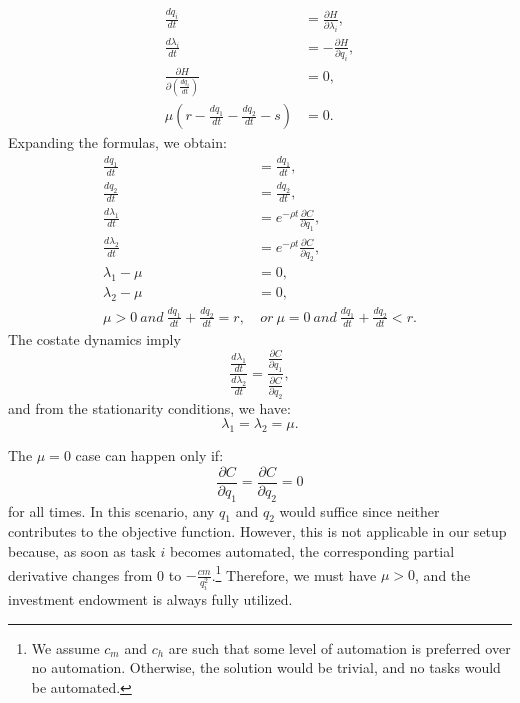 \documentclass{article}
\theoremstyle{plain}
\theoremstyle{plain}
\begin{document}
\begin{align*}
\frac{dq_{i}}{dt} & =\frac{\partial H}{\partial\lambda_{i}},\tag{State Dynamics}\\
\frac{d\lambda_{i}}{dt} & =-\frac{\partial H}{\partial q_{i}},\tag{Costate Dynamics}\\
\frac{\partial H}{\partial\left(\frac{dq_{i}}{dt}\right)} & =0,\tag{Stationarity}\\
\mu\left(r-\frac{dq_{1}}{dt}-\frac{dq_{2}}{dt}-s\right) & =0.\tag{Complementary Slackness}
\end{align*}
Expanding the formulas, we obtain:
\begin{align*}
\frac{dq_{1}}{dt} & =\frac{dq_{1}}{dt},\\
\frac{dq_{2}}{dt} & =\frac{dq_{2}}{dt},\\
\frac{d\lambda_{1}}{dt} & =e^{-\rho t}\frac{\partial C}{\partial q_{1}},\\
\frac{d\lambda_{2}}{dt} & =e^{-\rho t}\frac{\partial C}{\partial q_{2}},\\
\lambda_{1}-\mu & =0,\\
\lambda_{2}-\mu & =0,\\
\mu>0\ and\ \frac{dq_{1}}{dt}+\frac{dq_{2}}{dt}=r, & \ or\ \mu=0\ and\ \frac{dq_{1}}{dt}+\frac{dq_{2}}{dt}<r.
\end{align*}
The costate dynamics imply
\[
\frac{\frac{d\lambda_{1}}{dt}}{\frac{d\lambda_{2}}{dt}}=\frac{\frac{\partial C}{\partial q_{1}}}{\frac{\partial C}{\partial q_{2}}},
\]
and from the stationarity conditions, we have:
\[
\lambda_{1}=\lambda_{2}=\mu.
\]

The $\mu=0$ case can happen only if:
\[
\frac{\partial C}{\partial q_{1}}=\frac{\partial C}{\partial q_{2}}=0
\]
for all times. 
In this scenario, any $q_{1}$ and $q_{2}$ would suffice since neither contributes to the objective function. 
However, this is not applicable in our setup because, as soon as task $i$ becomes automated, the corresponding partial derivative changes from 0 to $-\frac{cm}{q_{i}^{2}}$.\footnote{We assume $c_{m}$ and $c_{h}$ are such that some level of automation is preferred over no automation. 
Otherwise, the solution would be trivial, and no tasks would be automated.} 
Therefore, we must have $\mu>0$, and the investment endowment is always fully utilized.
\end{document}

